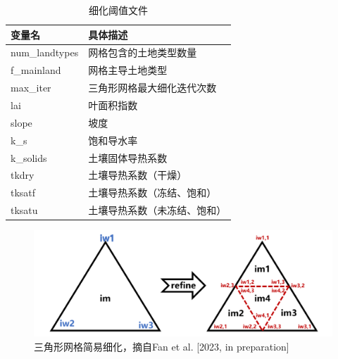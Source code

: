 {
\begin{table}[]
\centering
\caption{细化阈值文件}
\label{tab:细化阈值文件}
\begin{tabular}{@{}ll@{}}
\toprule
变量名            & 具体描述           \\\midrule
num\_landtypes & 网格包含的土地类型数量    \\
f\_mainland    & 网格主导土地类型       \\
max\_iter      & 三角形网格最大细化迭代次数  \\
lai            & 叶面积指数          \\
slope          & 坡度             \\
k\_s           & 饱和导水率          \\
k\_solids      & 土壤固体导热系数       \\
tkdry          & 土壤导热系数（干燥）     \\
tksatf         & 土壤导热系数（冻结、饱和）  \\
tksatu         & 土壤导热系数（未冻结、饱和） \\\bottomrule
\end{tabular}
\end{table}
}

 {
\begin{figure}[]
\centering
\includegraphics{Figures/模式构架/三角形网格简易细化.png}
\caption{三角形网格简易细化，摘自Fan et al. [2023, in preparation]}
\label{fig:三角形网格简易细化}
\end{figure}
}

